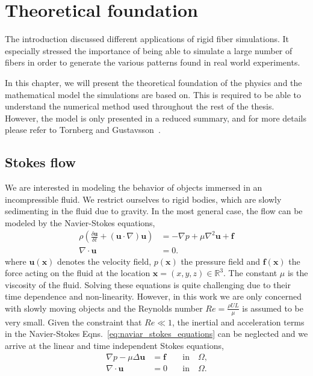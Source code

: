 \chapter{Theoretical foundation}
\label{cha:theoretical_foundation}
The introduction discussed different applications of rigid fiber simulations. It especially stressed the importance of being able to simulate a large number of fibers in order to generate the various patterns found in real world experiments.

In this chapter, we will present the theoretical foundation of the physics and the mathematical model the simulations are based on. This is required to be able to understand the numerical method used throughout the rest of the thesis. However, the model is only presented in a reduced summary, and for more details please refer to Tornberg and Gustavsson~\cite{Tornberg2006}.

\section{Stokes flow}
\label{sec:stokes_flow}

We are interested in modeling the behavior of objects immersed in an incompressible fluid. We restrict ourselves to rigid bodies, which are slowly sedimenting in the fluid due to gravity. In the most general case, the flow can be modeled by the Navier-Stokes equations,
\begin{equation}
  \label{eq:naviar_stokes_equations}
  \begin{aligned}
    \rho\left(\frac{\delta \mathbf{u}}{\delta t} + (\mathbf{u} \cdot \nabla)\mathbf{u}\right) &= -\nabla p + \mu\nabla^2\mathbf{u} + \mathbf{f} \\
    \nabla \cdot \mathbf{u} &= 0 \text{.}
  \end{aligned}
\end{equation}
where $\mathbf{u}(\mathbf{x})$ denotes the velocity field, $p(\mathbf{x})$ the pressure field and $\mathbf{f}(\mathbf{x})$ the force acting on the fluid at the location $\mathbf{x} = (x,y,z) \in \mathbb{R}^3$. The constant $\mu$ is the viscosity of the fluid. Solving these equations is quite challenging due to their time dependence and non-linearity. However, in this work we are only concerned with slowly moving objects and the Reynolds number $Re = \frac{\rho U L}{\mu}$ is assumed to be very small. Given the constraint that $Re \ll 1$, the inertial and acceleration terms in the Navier-Stokes Eqns.~\eqref{eq:naviar_stokes_equations} can be neglected and we arrive at the linear and time independent Stokes equations,
\begin{equation}
  \label{eq:stokes_equations}
  \begin{aligned}
    \nabla p - \mu \Delta \mathbf{u} &= \mathbf{f} \quad &\text{in} \quad \Omega \text{,}\\
    \nabla \cdot \mathbf{u} &= 0 \quad &\text{in} \quad \Omega \text{.}
  \end{aligned}
\end{equation}

